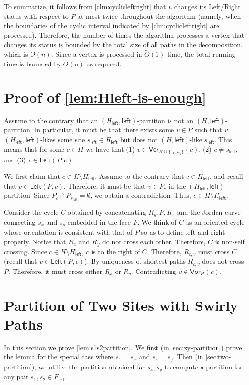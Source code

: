 \documentclass{article}
\newcommand{\Left}{\mathsf{Left}}
\newcommand{\leftside}{\mathsf{left}}
\newcommand{\Vor}{\textsf{Vor}}
\newcommand{\Otild}{\tilde{O}}
\begin{document}
    To summarize, it follows from \cref{clm:cyclicleftright} that $u$ changes its Left/Right status with respect to $P$ at most twice throughout the algorithm (namely, when the boundaries of the cyclic interval indicated by \cref{clm:cyclicleftright} are processed).
    Therefore, the number of times the algorithm processes a vertex that changes its status is bounded by the total size of all paths in the decomposition, which is $O(n)$.
    Since a vertex is processed in $\Otild
    (1)$ time, the total running time is bounded by $\Otild(n)$ as required.



\section{Proof of \cref{lem:Hleft-is-enough}}\label{app:missing_proof}

    Assume to the contrary that an $(H_{\leftside},\leftside)$-partition is not an $(H,\leftside)$-partition.
    In particular, it must be that there exists some $v\in P$ such that $v$ $(H_{\leftside},\leftside)$-likes some site $s_{\leftside}\in H_{\leftside}$ but does not $(H,\leftside)$-like $s_{\leftside}$.
    This means that for some $c\in H$ we have  that (1) $v\in\Vor_{H\cup\{s_x,s_y\}}(c)$,  (2) $c\ne s_{\leftside}$, and (3)  $v\in\Left(P,c)$.

    We first claim that $c\in H\setminus H_{\leftside}$.
    Assume to the contrary that $c\in H_{\leftside}$, and recall that $v\in\Left(P,c)$. Therefore, it must be that $v\in P_c$ in the $(H_{\leftside},\leftside)$-partition.
    Since $P_c\cap P_{s_{\leftside}}=\emptyset$, we obtain a contradiction.
    Thus, $c\in H\setminus H_{\leftside}$.

    Consider the cycle $C$ obtained by concatenating $R_y, P, R_x$  and the Jordan curve connecting $s_x$ and $s_y$ embedded in the face $F$.
    We think of $C$ as an oriented cycle whose orientation is consistent with that of $P$ so as to define left and right properly.
    Notice that $R_x$ and $R_y$ do not cross each other. Therefore, $C$ is non-self crossing.
    Since $c\in H\setminus H_{\leftside}$, $c$ is to the right of $C$. Therefore, $R_{c,v}$ must cross $C$ (recall that $v\in\Left(P,c)$).
    By uniqueness of shortest paths $R_{c,v}$ does not cross $P$. Therefore, it must cross either $R_x$ or $R_y$.
    Contradicting $v\in \Vor_H(c)$.




\section{Partition of Two Sites with Swirly Paths}\label{app:two_sites}
In this section we prove \cref{lem:s1s2partition}.
We first (in \cref{sec:xy-partition}) prove the lemma for the special case where $s_1=s_x$ and $s_2=s_y$.
Then (in \cref{sec:two-partition}), we utilize the partition obtained for $s_x,s_y$ to compute a partition for any pair $s_1,s_2\in F_{\leftside}$.
\end{document}
